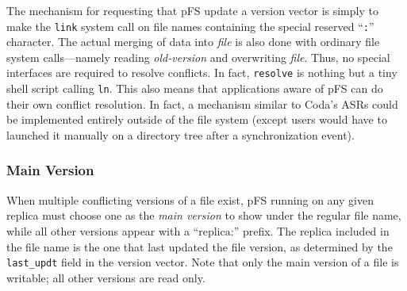 

The mechanism for requesting that pFS update a version vector is
simply to make the {\tt link} system call on file names containing the
special reserved ``\texttt{:}'' character.  The actual merging of data
into \emph{file} is also done with ordinary file system calls---namely
reading \emph{old-version} and overwriting \emph{file}.  Thus, no
special interfaces are required to resolve conflicts.  In fact,
\texttt{resolve} is nothing but a tiny shell script calling
\texttt{ln}.  This also means that applications aware of pFS can do
their own conflict resolution.  In fact, a mechanism similar to Coda's
ASRs could be implemented entirely outside of the file system (except
users would have to launched it manually on a directory tree after a
synchronization event).


\subsubsection{Main Version}

When multiple conflicting versions of a file exist, pFS running on any
given replica must choose one as the \emph{main version} to show under
the regular file name, while all other versions appear with a
``$\mathrm{replica}\texttt{:}$'' prefix.  The replica included in the
file name is the one that last updated the file version, as determined
by the \texttt{last\_updt} field in the version vector.  Note that
only the main version of a file is writable; all other versions are
read only.

